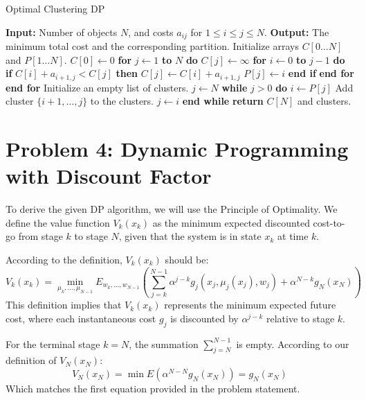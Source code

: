 \documentclass[11pt, a4paper, oneside]{memoir}
\begin{document}
\begin{algorithm}[H]
  \caption{Optimal Clustering DP}
  \label{alg:clustering}
  \begin{algorithmic}[1]
    \STATE \textbf{Input:} Number of objects $N$, and costs $a_{ij}$ for $1 \le i \le j \le N$.
    \STATE \textbf{Output:} The minimum total cost and the corresponding partition.
    \STATE Initialize arrays $C[0 \dots N]$ and $P[1 \dots N]$.
    \STATE $C[0] \leftarrow 0$
    \STATE \textbf{for} $j \leftarrow 1$ \textbf{to} $N$ \textbf{do}
    \STATE \quad $C[j] \leftarrow \infty$
    \STATE \quad \textbf{for} $i \leftarrow 0$ \textbf{to} $j-1$ \textbf{do}
    \STATE \quad \quad \textbf{if} $C[i] + a_{i+1, j} < C[j]$ \textbf{then}
    \STATE \quad \quad \quad $C[j] \leftarrow C[i] + a_{i+1, j}$
    \STATE \quad \quad \quad $P[j] \leftarrow i$
    \STATE \quad \quad \textbf{end if}
    \STATE \quad \textbf{end for}
    \STATE \textbf{end for}
    \STATE {}
    \STATE Initialize an empty list of clusters.
    \STATE $j \leftarrow N$
    \STATE \textbf{while} $j > 0$ \textbf{do}
    \STATE \quad $i \leftarrow P[j]$
    \STATE \quad Add cluster $\{i+1, \dots, j\}$ to the clusters.
    \STATE \quad $j \leftarrow i$
    \STATE \textbf{end while}
    \STATE \textbf{return} $C[N]$ and clusters.
  \end{algorithmic}
\end{algorithm}

\chapter{Problem 4: Dynamic Programming with Discount Factor}
To derive the given DP algorithm, we will use the Principle of Optimality.
We define the value function $V_k(x_k)$ as the minimum expected discounted cost-to-go from stage $k$ to stage $N$,
given that the system is in state $x_k$ at time $k$.

According to the definition, $V_k(x_k)$ should be:
\[ V_k(x_k) = \min_{\mu_k, \dots, \mu_{N-1}} E_{w_k, \dots, w_{N-1}} \left( \sum_{j=k}^{N-1} \alpha^{j-k} g_j(x_j, \mu_j(x_j), w_j) + \alpha^{N-k} g_N(x_N) \right) \]
This definition implies that $V_k(x_k)$ represents the minimum expected future cost,
where each instantaneous cost $g_j$ is discounted by $\alpha^{j-k}$ relative to stage $k$.

For the terminal stage $k=N$, the summation $\sum_{j=N}^{N-1}$ is empty. According to our definition of $V_N(x_N)$:
\[ V_N(x_N) = \min E \left( \alpha^{N-N} g_N(x_N) \right) = g_N(x_N) \]
Which matches the first equation provided in the problem statement.
\end{document}
